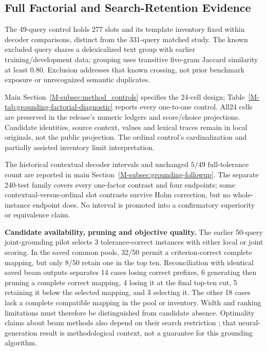 \subsection{Full Factorial and Search-Retention Evidence}
\label{app:factorial-details}

The 49-query control holds 277 slots and its template inventory fixed within decoder comparisons, distinct from the 331-query matched study. The known excluded query shares a delexicalized text group with earlier training/development data; grouping uses transitive five-gram Jaccard similarity at least 0.80. Exclusion addresses that known crossing, not prior benchmark exposure or unrecognized semantic duplicates.

Main Section~\ref{M-subsec:method_controls} specifies the 24-cell design; Table~\ref{M-tab:grounding-factorial-diagnostic} reports every one-to-one control. All24 cells are preserved in the release's numeric ledgers and score/choice projections. Candidate identities, source context, values and lexical traces remain in local originals, not the public projection. The ordinal control's cardinalization and partially assisted inventory limit interpretation.

The historical contextual decoder intervals and unchanged $5/49$ full-tolerance count are reported in main Section~\ref{M-subsec:grounding-followup}. The separate 240-test family covers every one-factor contrast and four endpoints; some contextual-versus-ordinal slot contrasts survive Holm correction, but no whole-instance endpoint does. No interval is promoted into a confirmatory superiority or equivalence claim.

\medskip\noindent\textbf{Candidate availability, pruning and objective quality.}
The earlier 50-query joint-grounding pilot selects 3 tolerance-correct
instances with either local or joint scoring. In the saved common pools,
32/50 permit a criterion-correct complete mapping, but only 8/50 retain one
in the top ten. Reconciliation with identical saved beam outputs separates
14 cases losing correct prefixes, 6 generating then pruning a complete
correct mapping, 4 losing it at the final top-ten cut, 5 retaining it below
the selected mapping, and 3 selecting it. The other 18 cases lack a complete
compatible mapping in the pool or inventory. Width and ranking limitations
must therefore be distinguished from candidate absence. Optimality claims
about beam methods also depend on their search restriction
\cite{huang2017beamfollowup}; that neural-generation result is methodological
context, not a guarantee for this grounding algorithm.

